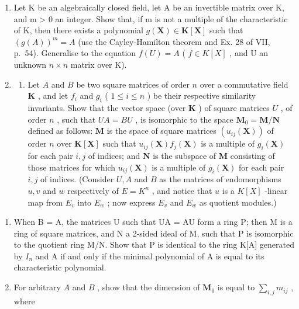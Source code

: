 \begin{enumerate}
\def\labelenumi{\arabic{enumi})}
\setcounter{enumi}{10}
\item
  Let K be an algebraically closed field, let A be an invertible matrix over K, and m \textgreater{} 0 an integer. Show that, if m is not a multiple of the characteristic of K, then there exists a polynomial \(g(\mathbf{X}) \in \mathbf{K}[\mathbf{X}]\) such that \((g(A))^{m} = A\) (use the Cayley-Hamilton theorem and Ex. 28 of VII, p.~54). Generalise to the equation \(f(U) = A\) ( \(f \in K[X]\) , and U an unknown \(n \times n\) matrix over K).
\item
  \begin{enumerate}
  \def\labelenumii{\alph{enumii})}
  \tightlist
  \item
    Let \(A\) and \(B\) be two square matrices of order \(n\) over a commutative field \(\mathbf{K}\) , and let \(f_i\) and \(g_i\) ( \(1 \leqslant i \leqslant n\) ) be their respective similarity invariants. Show that the vector space (over \(\mathbf{K}\) ) of square matrices \(U\) , of order \(n\) , such that \(UA = BU\) , is isomorphic to the space \(\mathbf{M}_0 = \mathbf{M} / \mathbf{N}\) defined as follows: \(\mathbf{M}\) is the space of square matrices \((u_{ij}(\mathbf{X}))\) of order \(n\) over \(\mathbf{K}[\mathbf{X}]\) such that \(u_{ij}(\mathbf{X}) f_j(\mathbf{X})\) is a multiple of \(g_i(\mathbf{X})\) for each pair \(i, j\) of indices; and \(\mathbf{N}\) is the subspace of \(\mathbf{M}\) consisting of those matrices for which \(u_{ij}(\mathbf{X})\) is a multiple of \(g_i(\mathbf{X})\) for each pair \(i, j\) of indices. (Consider \(U, A\) and \(B\) as the matrices of endomorphisms \(u, v\) and \(w\) respectively of \(E = K^n\) , and notice that \(u\) is a \(K[X]\) -linear map from \(E_v\) into \(E_w\) ; now express \(E_v\) and \(E_w\) as quotient modules.)
  \end{enumerate}
\end{enumerate}

\begin{enumerate}
\def\labelenumi{\alph{enumi})}
\setcounter{enumi}{1}
\item
  When B = A, the matrices U such that UA = AU form a ring P; then M is a ring of square matrices, and N a 2-sided ideal of M, such that P is isomorphic to the quotient ring M/N. Show that P is identical to the ring K{[}A{]} generated by \(I_{n}\) and A if and only if the minimal polynomial of A is equal to its characteristic polynomial.
\item
  For arbitrary \(A\) and \(B\) , show that the dimension of \(\mathbf{M}_0\) is equal to \(\sum_{i,j} m_{ij}\) , where
\end{enumerate}

